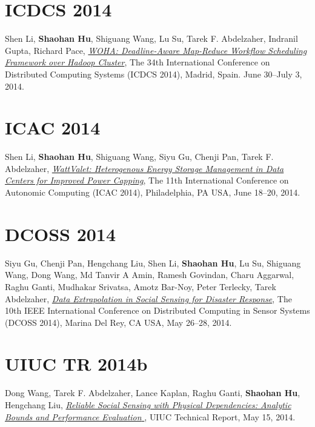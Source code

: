 \section{\sc ICDCS 2014}\hypertarget{li2014icdcs}{} Shen Li, \textbf{Shaohan Hu}, Shiguang Wang, Lu Su, Tarek F. Abdelzaher, Indranil Gupta, Richard Pace, \href{http://dl.acm.org/citation.cfm?id=2672596.2672734}{\emph{WOHA: Deadline-Aware Map-Reduce Workflow Scheduling Framework over Hadoop Cluster}}, \textsf{The 34th International Conference on Distributed Computing Systems (ICDCS 2014)}, Madrid, Spain. June 30--July 3, 2014.

\section{\sc ICAC 2014}\hypertarget{li2014icac}{} Shen Li, \textbf{Shaohan Hu}, Shiguang Wang, Siyu Gu, Chenji Pan, Tarek F. Abdelzaher, \href{https://www.usenix.org/system/files/conference/icac14/icac14-paper-li_shen.pdf}{\emph{WattValet: Heterogenous Energy Storage Management in Data Centers for Improved Power Capping}}, \textsf{The 11th International Conference on Autonomic Computing (ICAC 2014)}, Philadelphia, PA USA, June 18--20, 2014.

\section{\sc DCOSS 2014}\hypertarget{gu2014dcoss}{} Siyu Gu, Chenji Pan, Hengchang Liu, Shen Li, \textbf{Shaohan Hu}, Lu Su, Shiguang Wang, Dong Wang, Md Tanvir A Amin, Ramesh Govindan, Charu Aggarwal, Raghu Ganti, Mudhakar Srivatsa, Amotz Bar-Noy, Peter Terlecky, Tarek Abdelzaher, \href{http://ieeexplore.ieee.org/xpl/articleDetails.jsp?arnumber=6846153}{\emph{Data Extrapolation in Social Sensing for Disaster Response}}, \textsf{The 10th IEEE International Conference on Distributed Computing in Sensor Systems (DCOSS 2014)}, Marina Del Rey, CA USA, May 26--28, 2014.

\section{\sc UIUC TR 2014b}\hypertarget{wang2014uiuc}{} Dong Wang, Tarek F. Abdelzaher, Lance Kaplan, Raghu Ganti, \textbf{Shaohan Hu}, Hengchang Liu, \href{https://www.ideals.illinois.edu/handle/2142/49113}{\emph{Reliable Social Sensing with Physical Dependencies: Analytic Bounds and Performance Evaluation }}, \textsf{UIUC Technical Report}, May 15, 2014.

